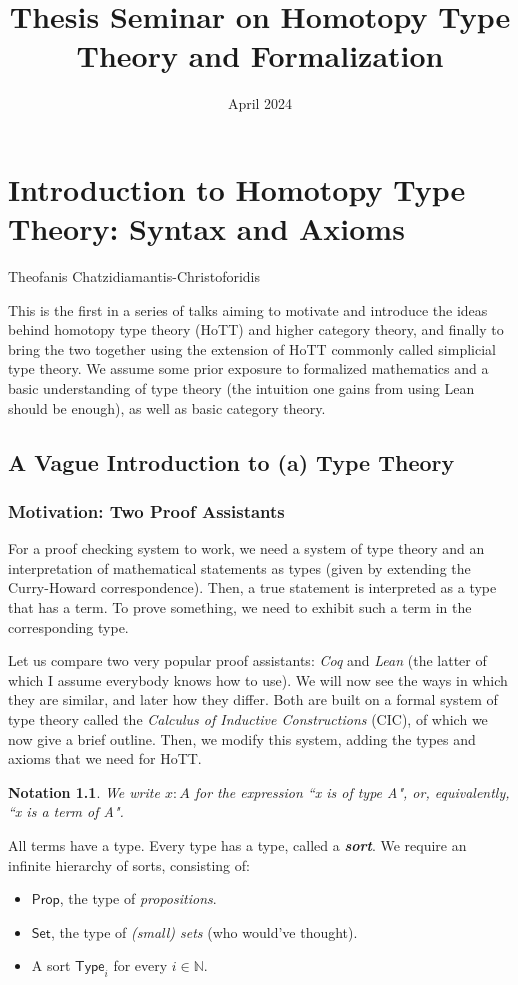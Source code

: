 \documentclass{scrreprt}
\title{Thesis Seminar on Homotopy Type Theory and Formalization}
\author{}
\date{April 2024}
\newcommand{\textbi}[1]{\textbf{\textit{#1}}}
\newcommand{\bN}{\mathbb{N}}
\newcommand{\tProp}{\mathsf{Prop}}
\newcommand{\tSet}{\mathsf{Set}}
\newcommand{\tType}{\mathsf{Type}}
\newcommand{\chapterauthor}[1]{%
  {\parindent0pt\vspace*{-10pt}%
  \linespread{1.1}\fontsize{16}{12}\selectfont#1%
  \par\nobreak\vspace*{30pt}}
}
\newtheorem{nota}[subsection]{Notation}
\begin{document}
\maketitle

\tableofcontents

\chapter{Introduction to Homotopy Type Theory: Syntax and Axioms}
\chapterauthor{Theofanis Chatzidiamantis-Christoforidis}

This is the first in a series of talks aiming to motivate and introduce the ideas behind homotopy type theory (HoTT) and higher category theory, and finally to bring the two together using the extension of HoTT commonly called simplicial type theory. We assume some prior exposure to formalized mathematics and a basic understanding of type theory (the intuition one gains from using Lean should be enough), as well as basic category theory.

\section{A Vague Introduction to (a) Type Theory}

\subsection*{Motivation: Two Proof Assistants}

For a proof checking system to work, we need a system of type theory and an interpretation of mathematical statements as types (given by extending the Curry-Howard correspondence). Then, a true statement is interpreted as a type that has a term. To prove something, we need to exhibit such a term in the corresponding type. 
\par Let us compare two very popular proof assistants: \textit{Coq} and \textit{Lean} (the latter of which I assume everybody knows how to use). We will now see the ways in which they are similar, and later how they differ. Both are built on a formal system of type theory called the \textit{Calculus of Inductive Constructions} (CIC), of which we now give a brief outline. Then, we modify this system, adding the types and axioms that we need for HoTT.

\begin{nota}
    We write $x:A$ for the expression ``x is of type A", or, equivalently, ``x is a term of A".
\end{nota}
All terms have a type. Every type has a type, called a \textbi{sort}. We require an infinite hierarchy of sorts, consisting of:
\begin{itemize}
    \item $\tProp$, the type of \textit{propositions}. 
    \item $\tSet$, the type of \textit{(small) sets} (who would've thought).
    \item A sort $\tType_i$ for every $i\in\bN$. 
\end{itemize}
\end{document}
